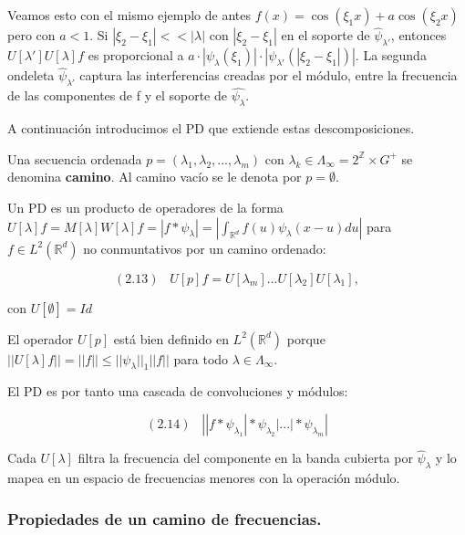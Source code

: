 \medskip

\noindent Veamos esto con el mismo ejemplo de antes $f(x)=\cos(\xi_1 x)+a\cos(\xi_2 x)$ pero con $a<1$. Si $|\xi_2-\xi_1| << |\lambda|$ con $|\xi_2 - \xi_1|$ en el soporte de $\widehat{\psi}_{\lambda'}$, entonces $U[\lambda']U[\lambda]f$ es proporcional a $a\cdot |\psi_\lambda(\xi_1)|\cdot |\psi_{\lambda'}(|\xi_2-\xi_1|)|$. La segunda ondeleta $\widehat{\psi}_{\lambda'}$ captura las interferencias creadas por el módulo, entre la frecuencia de las componentes de f y el soporte de $\widehat{\psi_\lambda}$.

\medskip

\noindent A continuación introducimos el PD que extiende estas descomposiciones.

\medskip

\begin{definicion}
Una secuencia ordenada $p=(\lambda_1,\lambda_2, ... , \lambda_m)$ con $\lambda_k \in \Lambda_\infty=2^{\mathbb{Z}} \times G^{+} $ se denomina \textbf{camino}. Al camino vacío se le denota por $p=\emptyset$. 
\end{definicion}


\begin{definicion}
Un PD es un producto de operadores de la forma $U[\lambda]f=M[\lambda]W[\lambda]f=|f \ast \psi_\lambda|=\left | \int_{\mathbb{R}^d} f(u)\psi_\lambda(x-u) du \right|$ para $f \in L^2(\mathbb{R}^d)$ no conmuntativos por un camino ordenado:

$$(2.13) \;\;\; U[p]f=U[\lambda_m]...U[\lambda_2]U[\lambda_1],$$

con $U[\emptyset]=Id$
\end{definicion}

\noindent El operador $U[p]$ está bien definido en $L^2(\mathbb{R}^d)$ porque $\left|\left| U[\lambda]f \right|\right| = ||f|| \leq ||\psi_\lambda||_1 ||f||$ para todo $\lambda \in \Lambda_\infty$. 

\noindent El PD es por tanto una cascada de convoluciones y módulos: 

$$(2.14) \;\;\; \left| |f \ast \psi_{\lambda_1} | \ast \psi_{\lambda_2} | ... | \ast \psi_{\lambda_m} \right|$$

\medskip

\noindent Cada $U[\lambda]$ filtra la frecuencia del componente en la banda cubierta por $\widehat{\psi}_\lambda$ y lo mapea en un espacio de frecuencias menores con la operación módulo.

\subsubsection{Propiedades de un camino de frecuencias.}

